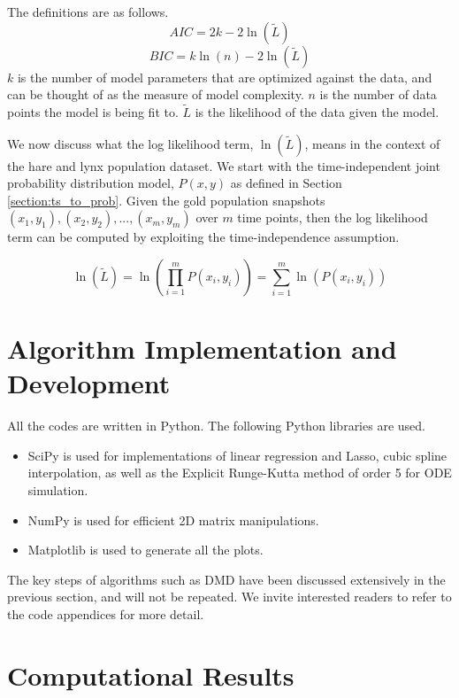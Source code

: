 \documentclass[letterpaper, 10 pt, conference]{ieeeconf}  %
\begin{document}
The definitions are as follows.
\begin{equation}
    AIC = 2k - 2 \ln(\tilde{L})
\end{equation}
\begin{equation}
    BIC = k\ln(n) - 2 \ln(\tilde{L})
\end{equation}
$k$ is the number of model parameters that are optimized against the data, and can be thought of as the measure of model complexity.  $n$ is the number of data points the model is being fit to. $\tilde{L}$ is the likelihood of the data given the model.

We now discuss what the log likelihood term, $\ln(\tilde{L})$, means in the context of the hare and lynx population dataset. We start with the time-independent joint probability distribution model, $P(x,y)$ as defined in Section \ref{section:ts_to_prob}. Given the gold population snapshots $(x_1, y_1), (x_2, y_2), ..., (x_m, y_m)$ over $m$ time points, then the log likelihood term can be computed by exploiting the time-independence assumption.

\begin{equation}
\ln(\tilde{L}) = \ln(\prod_{i=1}^m P(x_i, y_i)) = \sum_{i=1}^m \ln(P(x_i, y_i))
\end{equation}
\section{Algorithm Implementation and Development}
All the codes are written in Python. The following Python libraries are used.
\begin{itemize}
    \item SciPy is used for implementations of linear regression and Lasso, cubic spline interpolation, as well as the Explicit Runge-Kutta method of order 5\cite{dormand1980rangekutta} for ODE simulation.
    \item NumPy is used for efficient 2D matrix manipulations.
    \item Matplotlib is used to generate all the plots.
\end{itemize}

The key steps of algorithms such as DMD have been discussed extensively in the previous section, and will not be repeated. We invite interested readers to refer to the code appendices for more detail.

\section{Computational Results}
\end{document}

